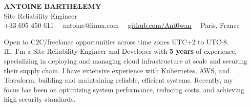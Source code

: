 \documentclass[10pt]{developercv}
\begin{document}
\begin{center}
    {\huge\textbf{\MakeUppercase{Antoine Barthelemy}}} \\
    \vspace{4pt}
    {\LARGE Site Reliability Engineer} \\
    \vspace{4pt}
	+33 695 450 611 \ \ antoine@linux.com \ \ \href{https://github.com/Ant0wan}{github.com/Ant0wan} \ \ Paris, France
\end{center}

\hspace{0pt}
\begin{minipage}[t]{1.00\textwidth}
\vspace{0pt}
	{Open to C2C/freelance opportunities across time zones UTC+2 to UTC-8.\\Hi, I’m a Site Reliability Engineer and Developer with \textbf{5 years} of experience, specializing in deploying and managing cloud infrastructure at scale and securing their supply chain. I have extensive experience with Kubernetes, AWS, and Terraform, building and maintaining reliable, efficient systems. Recently, my focus has been on optimizing system performance, reducing costs, and achieving high security standards.}
\end{minipage}
\vspace{6pt}
\hfill

\end{document}
